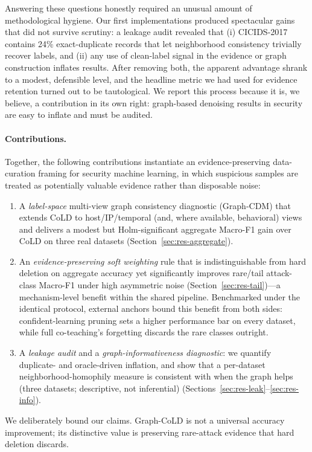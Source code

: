 \documentclass[preprint,3p,times]{elsarticle}
\begin{document}
Answering these questions honestly required an unusual amount of methodological
hygiene. Our first implementations produced spectacular gains that did not
survive scrutiny: a leakage audit revealed that (i) CICIDS-2017 contains 24\%
exact-duplicate records that let neighborhood consistency trivially recover
labels, and (ii) any use of clean-label signal in the evidence or graph
construction inflates results. After removing both, the apparent advantage shrank
to a modest, defensible level, and the headline metric we had used for evidence
retention turned out to be tautological. We report this process because it is, we
believe, a contribution in its own right: graph-based denoising results in
security are easy to inflate and must be audited.

\paragraph{Contributions.}
Together, the following contributions instantiate an evidence-preserving
data-curation framing for security machine learning, in which suspicious
samples are treated as potentially valuable evidence rather than disposable
noise:
\begin{enumerate}
\item A \emph{label-space} multi-view graph consistency diagnostic (Graph-CDM)
that extends CoLD to host/IP/temporal (and, where available, behavioral) views and
delivers a modest but Holm-significant aggregate Macro-F1 gain over CoLD on three
real datasets (Section~\ref{sec:res-aggregate}).
\item An \emph{evidence-preserving soft weighting} rule that is
indistinguishable from hard deletion on aggregate accuracy yet significantly
improves rare/tail attack-class Macro-F1 under high asymmetric noise
(Section~\ref{sec:res-tail})—a mechanism-level benefit within the shared
pipeline. Benchmarked under the identical protocol, external anchors bound this
benefit from both sides: confident-learning pruning sets a higher performance
bar on every dataset, while full co-teaching's forgetting discards the rare
classes outright.
\item A \emph{leakage audit} and a \emph{graph-informativeness diagnostic}: we
quantify duplicate- and oracle-driven inflation, and show that a per-dataset
neighborhood-homophily measure is consistent with when the graph helps (three
datasets; descriptive, not inferential)
(Sections~\ref{sec:res-leak}--\ref{sec:res-info}).
\end{enumerate}
We deliberately bound our claims. Graph-CoLD is not a universal accuracy
improvement; its distinctive value is preserving rare-attack evidence that hard
deletion discards.
\end{document}
